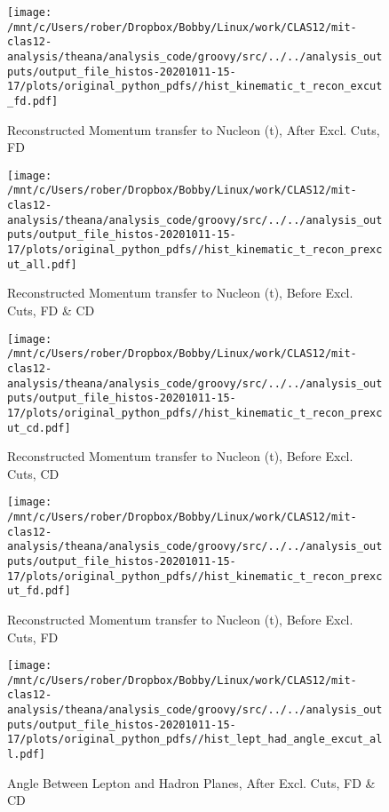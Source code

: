 \documentclass{article}
\begin{document}
\begin{landscape}
\begin{figure}[h]
        \texttt{[image: /mnt/c/Users/rober/Dropbox/Bobby/Linux/work/CLAS12/mit-clas12-analysis/theana/analysis\_code/groovy/src/../../analysis\_outputs/output\_file\_histos-20201011-15-17/plots/original\_python\_pdfs//hist\_kinematic\_t\_recon\_excut\_fd.pdf]}
        \captionsetup{textformat=empty,labelformat=blank}
        \caption{Reconstructed Momentum transfer to Nucleon (t), After Excl. Cuts, FD}
    \end{figure}
    \clearpage
    
    \begin{figure}[h]
        \centering

        \texttt{[image: /mnt/c/Users/rober/Dropbox/Bobby/Linux/work/CLAS12/mit-clas12-analysis/theana/analysis\_code/groovy/src/../../analysis\_outputs/output\_file\_histos-20201011-15-17/plots/original\_python\_pdfs//hist\_kinematic\_t\_recon\_prexcut\_all.pdf]}
        \captionsetup{textformat=empty,labelformat=blank}
        \caption{Reconstructed Momentum transfer to Nucleon (t), Before Excl. Cuts, FD \& CD}
    \end{figure}
    \clearpage
    
    \begin{figure}[h]
        \centering

        \texttt{[image: /mnt/c/Users/rober/Dropbox/Bobby/Linux/work/CLAS12/mit-clas12-analysis/theana/analysis\_code/groovy/src/../../analysis\_outputs/output\_file\_histos-20201011-15-17/plots/original\_python\_pdfs//hist\_kinematic\_t\_recon\_prexcut\_cd.pdf]}
        \captionsetup{textformat=empty,labelformat=blank}
        \caption{Reconstructed Momentum transfer to Nucleon (t), Before Excl. Cuts, CD}
    \end{figure}
    \clearpage
    
    \begin{figure}[h]
        \centering

        \texttt{[image: /mnt/c/Users/rober/Dropbox/Bobby/Linux/work/CLAS12/mit-clas12-analysis/theana/analysis\_code/groovy/src/../../analysis\_outputs/output\_file\_histos-20201011-15-17/plots/original\_python\_pdfs//hist\_kinematic\_t\_recon\_prexcut\_fd.pdf]}
        \captionsetup{textformat=empty,labelformat=blank}
        \caption{Reconstructed Momentum transfer to Nucleon (t), Before Excl. Cuts, FD}
    \end{figure}
    \clearpage
    
    \begin{figure}[h]
        \centering

        \texttt{[image: /mnt/c/Users/rober/Dropbox/Bobby/Linux/work/CLAS12/mit-clas12-analysis/theana/analysis\_code/groovy/src/../../analysis\_outputs/output\_file\_histos-20201011-15-17/plots/original\_python\_pdfs//hist\_lept\_had\_angle\_excut\_all.pdf]}
        \captionsetup{textformat=empty,labelformat=blank}
        \caption{Angle Between Lepton and Hadron Planes, After Excl. Cuts, FD \& CD}
    \end{figure}
    \clearpage
    

\end{landscape}
\end{document}

